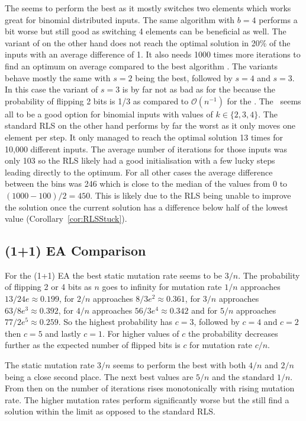 The \RLSN[2] seems to perform the best as it mostly switches two elements which works great for binomial distributed inputs.
The same algorithm with $b=4$ performs a bit worse but still good as switching 4 elements can be beneficial as well.
The variant of \RLSN[3] on the other hand does not reach the optimal solution in 20\% of the inputs with an average difference of 1.
It also needs 1000 times more iterations to find an optimum on average compared to the best algorithm \RLSN[2].
The \RLSR[s] variants behave mostly the same with $s=2$ being the best, followed by $s=4$ and $s=3$.
In this case the variant of $s=3$ is by far not as bad as for the \RLSN[3] because the probability of flipping 2 bits is 1/3 as compared to $\mathcal{O}(n^{-1})$ for the \RLSN[3].
The \RLSR~seems all to be a good option for binomial inputs with values of $k\in\{2,3,4\}$.
The standard RLS on the other hand performs by far the worst as it only moves one element per step.
It only managed to reach the optimal solution 13 times for 10,000 different inputs.
The average number of iterations for those inputs was only 103 so the RLS likely had a good initialisation with a few lucky steps leading directly to the optimum.
For all other cases the average difference between the bins was 246 which is close to the median of the values from 0 to $(1000-100)/2=450$.
This is likely due to the RLS being unable to improve the solution once the current solution has a difference below half of the lowest value (Corollary~\ref{cor:RLSStuck}).
\subsection{(1+1) EA Comparison}
For the (1+1) EA the best static mutation rate seems to be $3/n$.
The probability of flipping 2 or 4 bits as $n$ goes to infinity for mutation rate $1/n$ approaches $13/24e\approx 0.199$, for $2/n$ approaches $8/3e^2\approx 0.361$, for $3/n$ approaches $63/8e^3\approx 0.392$, for $4/n$ approaches $56/3e^4\approx 0.342$ and for $5/n$ approaches $77/2e^5\approx 0.259$.
So the highest probability has $c=3$, followed by $c=4$ and $c=2$ then $c=5$ and lastly $c=1$.
For higher values of $c$ the probability decreases further as the expected number of flipped bits is $c$ for mutation rate $c/n$.



The static mutation rate $3/n$ seems to perform the best with both $4/n$ and $2/n$ being a close second place.
The next best values are $5/n$ and the standard $1/n$.
From then on the number of iterations rises monotonically with rising mutation rate.
The higher mutation rates perform significantly worse but the still find a solution within the limit as opposed to the standard RLS.
